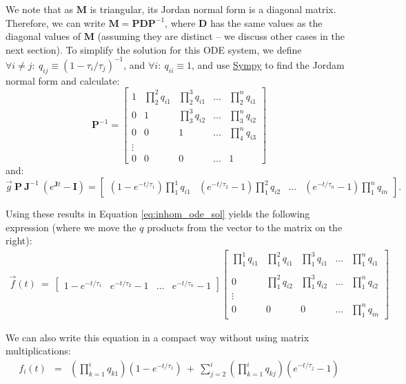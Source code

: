 \documentclass{article}
\begin{document}
We note that as $\mathbf{M}$ is triangular, its Jordan normal form is a diagonal matrix. Therefore, we can write $\mathbf{M} = \mathbf{P} \mathbf{D} \mathbf{P}^{-1}$, where $\mathbf{D}$ has the same values as the diagonal values of $\mathbf{M}$ (assuming they are distinct -- we discuss other cases in the next section). To simplify the solution for this ODE system, we define $\forall i \neq j:~q_{ij} \equiv (1 - \tau_i/\tau_j)^{-1}$, and $\forall i:~q_{ii} \equiv 1$, and use \href{https://www.sympy.org/}{Sympy} to find the Jordam normal form and calculate:
\[
\mathbf{P}^{-1} =
\begin{bmatrix}
1 & \prod_{2}^2 q_{i1} & \prod_{2}^3 q_{i1} & \ldots & \prod_{2}^n q_{i1} \\
0 & 1 & \prod_{3}^3 q_{i2} & \ldots & \prod_{3}^n q_{i2} \\
0 & 0 & 1 & \ldots & \prod_{4}^n q_{i3} \\
\vdots\\
0 & 0 & 0 & \ldots & 1
\end{bmatrix}
\]
and:
\[
    \vec{g}~\mathbf{P}~\mathbf{J}^{-1}~\left( e^{\mathbf{J} t} - \mathbf{I} \right)
    =
    \begin{bmatrix}
        (1 - e^{-t/\tau_1})\prod_{1}^1 q_{i1} & (e^{-t/\tau_2}-1) \prod_{1}^2 q_{i2} & \ldots & (e^{-t/\tau_n}-1) \prod_{1}^n q_{in}
    \end{bmatrix}.
\]

Using these results in Equation \ref{eq:inhom_ode_sol} yields the following expression (where we move the $q$ products from the vector to the matrix on the right):
\begin{eqnarray}
	\vec{f}(t) ~=~
    \begin{bmatrix}
        1 - e^{-t/\tau_1} & e^{-t/\tau_2}-1 & \ldots & e^{-t/\tau_n}-1
    \end{bmatrix}
    \begin{bmatrix}
        \prod_1^1 q_{i1} & \prod_1^2 q_{i1} & \prod_1^3 q_{i1}  & \ldots & \prod_1^n q_{i1} \\ \\
        0 & \prod_1^2 q_{i2} & \prod_1^3 q_{i2} & \ldots & \prod_1^n q_{i2} \\
        \vdots\\
        0 & 0 & 0 & \ldots & \prod_1^n q_{in}
    \end{bmatrix}\label{eq:lin_path_solution}
\end{eqnarray}

We can also write this equation in a compact way without using matrix multiplications:
\begin{eqnarray}
f_i(t) &=& 
    \left(\prod_{k=1}^i q_{k1}\right) (1 - e^{-t/\tau_1}) ~+~
    \sum_{j=2}^i \left(\prod_{k=1}^i q_{kj}\right) (e^{-t/\tau_j} - 1)
\end{eqnarray}
\end{document}

